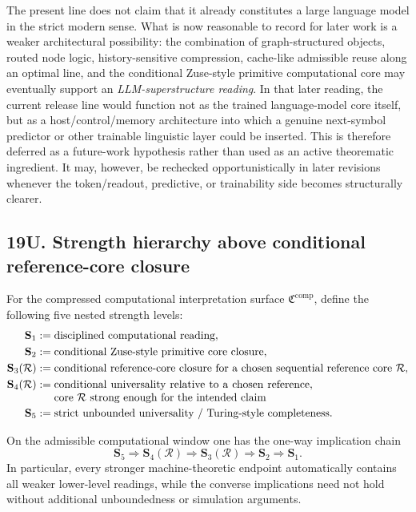 \begin{remark}
The present line does not claim that it already constitutes a large language model in the strict modern sense. What is now reasonable to record for later work is a weaker architectural possibility: the combination of graph-structured objects, routed node logic, history-sensitive compression, cache-like admissible reuse along an optimal line, and the conditional Zuse-style primitive computational core may eventually support an \emph{LLM-superstructure reading}. In that later reading, the current release line would function not as the trained language-model core itself, but as a host/control/memory architecture into which a genuine next-symbol predictor or other trainable linguistic layer could be inserted. This is therefore deferred as a future-work hypothesis rather than used as an active theorematic ingredient. It may, however, be rechecked opportunistically in later revisions whenever the token/readout, predictive, or trainability side becomes structurally clearer.
\end{remark}


\subsection*{19U. Strength hierarchy above conditional reference-core closure}

\begin{definition}
For the compressed computational interpretation surface $\mathfrak C^{\mathrm{comp}}$, define the following five nested strength levels:
\[
\begin{aligned}
\mathbf S_1&:=\text{disciplined computational reading},\\
\mathbf S_2&:=\text{conditional Zuse-style primitive core closure},\\
\mathbf S_3(\mathcal R)&:=\text{conditional reference-core closure for a chosen sequential reference core }\mathcal R,\\
\mathbf S_4(\mathcal R)&:=\parbox[t]{0.68\linewidth}{conditional universality relative to a chosen reference core $\mathcal R$ strong enough for the intended claim},\\
\mathbf S_5&:=\text{strict unbounded universality / Turing-style completeness}.
\end{aligned}
\]
\end{definition}

\begin{proposition}
On the admissible computational window one has the one-way implication chain
\[
\mathbf S_5\Longrightarrow \mathbf S_4(\mathcal R)\Longrightarrow \mathbf S_3(\mathcal R)\Longrightarrow \mathbf S_2\Longrightarrow \mathbf S_1.
\]
In particular, every stronger machine-theoretic endpoint automatically contains all weaker lower-level readings, while the converse implications need not hold without additional unboundedness or simulation arguments.
\end{proposition}

